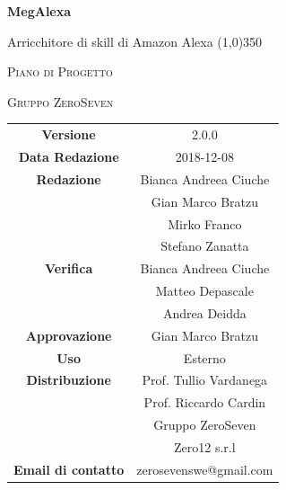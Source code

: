 \documentclass[a4paper,12pt, openany]{book}
\author{Mirko Franco}
\date{2018-11-26}
\begin{document}
\begin{titlepage}
	\centering
	{\huge\bfseries MegAlexa\par}
	Arricchitore di skill di Amazon Alexa
	\line(1,0){350} \\
	{\scshape\LARGE Piano di Progetto \par}
	\vspace{1cm}
	{\scshape Gruppo ZeroSeven \par}
	\logo
	\begin{tabular}{c|c}
		{\hfill \textbf{Versione}} 			& 2.0.0	    \\
		{\hfill\textbf{Data Redazione}} 	& 2018-12-08\\ 
		{\hfill\textbf{Redazione}} 			&  Bianca Andreea Ciuche\\	& Gian Marco Bratzu\\ &Mirko Franco\\&Stefano Zanatta\\
		{\hfill\textbf{Verifica}} 		&  	Bianca Andreea Ciuche \\& Matteo Depascale\\ &Andrea Deidda\\
		{\hfill\textbf{Approvazione}} 		&  		Gian Marco Bratzu	\\ 
		{\hfill\textbf{Uso}} 					& 		Esterno		\\ 
		{\hfill\textbf{Distribuzione}} 			& 			Prof. Tullio Vardanega \\ & Prof. Riccardo Cardin \\ & Gruppo ZeroSeven		\\ & Zero12 s.r.l \\ 
		{\hfill\textbf{Email di contatto}} & zerosevenswe@gmail.com \\
	\end{tabular}
\end{titlepage}
	\label{LastFrontPage}
	\newpage	
	
	\pagestyle{mymain}
	\tableofcontents
	\listoftables
	\listoffigures
	
	
	
	
	
	\begin{appendices}
		
		
	\end{appendices}
	\label{LastPage}
\end{document}
